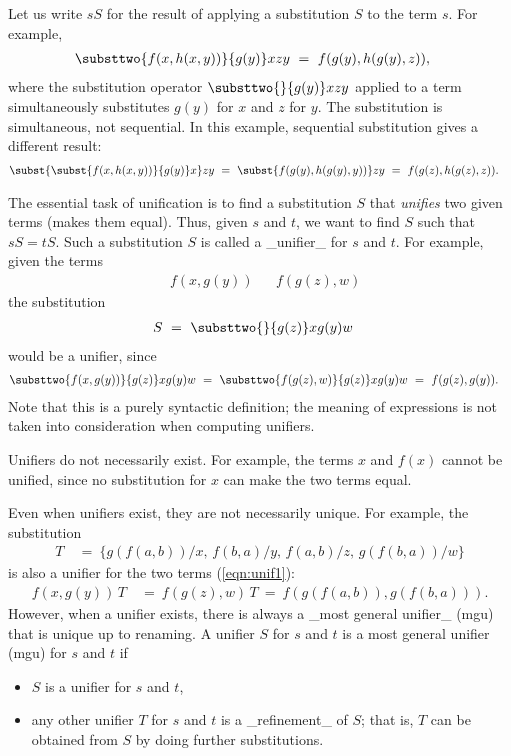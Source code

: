 Let us write $sS$ for the result of applying a substitution $S$ to the term $s$. For example,
\begin{align*}
\substtwo{f(x,h(x,y))}{g(y)}xzy\ &=\ f(g(y),h(g(y),z)),
\end{align*}
where the substitution operator $\substtwo{}{g(y)}xzy$ applied to a term simultaneously substitutes $g(y)$ for $x$ and $z$ for $y$. The substitution is simultaneous, not sequential. In this example, sequential substitution gives a different result:
\begin{align*}
\subst{\subst{f(x,h(x,y))}{g(y)}x}zy\ &=\ \subst{f(g(y),h(g(y),y))}zy\ =\ f(g(z),h(g(z),z)).
\end{align*}

The essential task of unification is to find a substitution $S$ that \emph{unifies} two given terms (makes them equal). Thus, given $s$ and $t$, we want to find $S$ such that $s S = t S$. Such a substitution $S$ is called a _unifier_ for $s$ and $t$. For example, given the terms
\begin{align}
& f(x,g(y)) && f(g(z),w)\label{eqn:unif1}
\end{align}
the substitution
\begin{align}
S\ &=\ \substtwo{}{g(z)}x{g(y)}w\label{eqn:substS}
\end{align}
would be a unifier, since 
\begin{align*}
\substtwo{f(x,g(y))}{g(z)}x{g(y)}w\ &=\ \substtwo{f(g(z),w)}{g(z)}x{g(y)}w\ =\ f(g(z),g(y)).
\end{align*}
Note that this is a purely syntactic definition; the meaning of expressions is not taken into consideration when computing unifiers.

Unifiers do not necessarily exist. For example, the terms $x$ and $f(x)$ cannot be unified, since no substitution for $x$ can make the two terms equal.

Even when unifiers exist, they are not necessarily unique. For example, the substitution
\begin{align*}
T\ &=\ \{g(f(a,b))/x,\,f(b,a)/y,\,f(a,b)/z,\,g(f(b,a))/w\}
\end{align*}
is also a unifier for the two terms (\ref{eqn:unif1}):
\begin{align*}
f(x,g(y))\,T\ &=\ f(g(z),w)\,T\ =\ f(g(f(a,b)),g(f(b,a))).
\end{align*}
However, when a unifier exists, there is always a _most general unifier_ (mgu) that is unique up to renaming. A unifier $S$ for $s$ and $t$ is a most general unifier (mgu) for $s$ and $t$ if
\begin{itemize}
\item
$S$ is a unifier for $s$ and $t$,
\item
any other unifier $T$ for $s$ and $t$ is a _refinement_ of $S$; that is, $T$ can be obtained from $S$ by doing further substitutions.
\end{itemize}

